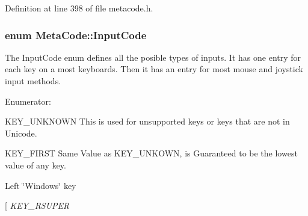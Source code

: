 Definition at line 398 of file metacode.h.\hypertarget{classMetaCode_a7390e6f58e25c0ce377bba4e63081b24}{
\subsubsection[{InputCode}]{\setlength{\rightskip}{0pt plus 5cm}enum {\bf MetaCode::InputCode}}}
\label{d7/d72/classMetaCode_a7390e6f58e25c0ce377bba4e63081b24}


The InputCode enum defines all the posible types of inputs. It has one entry for each key on a most keyboards. Then it has an entry for most mouse and joystick input methods. \begin{Desc}
\item[Enumerator: ]\par
\begin{description}
\item[{\em 
\hypertarget{classMetaCode_a7390e6f58e25c0ce377bba4e63081b24af7c19e29f8e1299858f9a9a0e2e0df32}{
KEY\_\-FIRST}
\label{d7/d72/classMetaCode_a7390e6f58e25c0ce377bba4e63081b24af7c19e29f8e1299858f9a9a0e2e0df32}
}]KEY\_\-UNKNOWN This is used for unsupported keys or keys that are not in Unicode. \item[{\em 
\hypertarget{classMetaCode_a7390e6f58e25c0ce377bba4e63081b24a11be427f22c538fc5682e0b7fa3e1e6d}{
KEY\_\-BACKSPACE}
\label{d7/d72/classMetaCode_a7390e6f58e25c0ce377bba4e63081b24a11be427f22c538fc5682e0b7fa3e1e6d}
}]KEY\_\-FIRST Same Value as KEY\_\-UNKOWN, is Guaranteed to be the lowest value of any key. \item[{\em 
\hypertarget{classMetaCode_a7390e6f58e25c0ce377bba4e63081b24a6404942e1d26f745d17c7a508c0ffa55}{
KEY\_\-LSUPER}
\label{d7/d72/classMetaCode_a7390e6f58e25c0ce377bba4e63081b24a6404942e1d26f745d17c7a508c0ffa55}
}]Left \char`\"{}Windows\char`\"{} key \item[{\em 
\hypertarget{classMetaCode_a7390e6f58e25c0ce377bba4e63081b24a729875d449534841cde46b53777f7753}{
KEY\_\-RSUPER}
\label{d7/d72/classMetaCode_a7390e6f58e25c0ce377bba4e63081b24a729875d449534841cde46b53777f7753}
}
\end{description}
\end{Desc}
